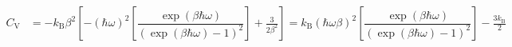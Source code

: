 \documentclass{article}
\begin{document}
\begin{enumerate}
		\begin{equation}
			\begin{split}
				C_\mathrm{V} &= -k_\mathrm{B} \beta^2 \left[ -(\hbar \omega)^2 \left[ \dfrac{ \exp(\beta\hbar\omega) }{(\exp(\beta\hbar\omega) - 1)^2} \right] + \frac{3}{2\beta^2} \right]
				= k_\mathrm{B}(\hbar \omega \beta)^2 \left[ \dfrac{ \exp(\beta\hbar\omega) }{(\exp(\beta\hbar\omega) - 1)^2} \right] - \frac{3 k_\mathrm{B}}{2}
			\end{split}
		\end{equation}
		
		
	\end{enumerate}
			
	
\end{document}
